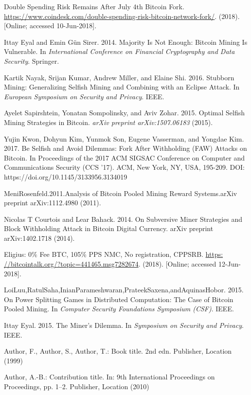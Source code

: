 \documentclass[a4paper, 11pt]{article}
\begin{document}
\begin{CJK*}{UTF8}{gbsn}
\begin{thebibliography}{8}
    Double Spending Risk Remains After July 4th Bitcoin Fork.
    \url{https://www.coindesk.com/double-spending-risk-bitcoin-network-fork/}. 
    (2018). [Online; accessed 10-Jun-2018].

    Ittay Eyal and Emin Gün Sirer. 2014. Majority Is Not Enough: Bitcoin Mining
    Is Vulnerable. 
    In \textit{International Conference on Financial Cryptography and Data
    Security}. Springer.

    Kartik Nayak, Srijan Kumar, Andrew Miller, and Elaine Shi. 2016. Stubborn
    Mining: Generalizing Selfish Mining and Combining with an Eclipse Attack. 
    In \textit{European Symposium on Security and Privacy}. IEEE.

    Ayelet Sapirshtein, Yonatan Sompolinsky, and Aviv Zohar. 2015. Optimal Selfish
    Mining Strategies in Bitcoin.
    \textit{arXiv preprint arXiv:1507.06183} (2015).

    Yujin Kwon, Dohyun Kim, Yunmok Son, Eugene Vasserman, and Yongdae Kim. 2017. 
    Be Selfish and Avoid Dilemmas: Fork After Withholding (FAW) Attacks on Bitcoin. 
    In Proceedings of the 2017 ACM SIGSAC Conference on Computer and Communications Security (CCS '17). 
    ACM, New York, NY, USA, 195-209. DOI: https://doi.org/10.1145/3133956.3134019

    MeniRosenfeld.2011.Analysis of Bitcoin Pooled Mining Reward Systems.arXiv
    preprint arXiv:1112.4980 (2011).

    Nicolas T Courtois and Lear Bahack. 2014. 
    On Subversive Miner Strategies and Block Withholding Attack in Bitcoin Digital Currency. 
    arXiv preprint arXiv:1402.1718 (2014).

    Eligius: 0\% Fee BTC, 105\% PPS NMC, No registration, CPPSRB.
    \url{https: //bitcointalk.org/?topic=441465.msg7282674}.
    (2018).
    [Online; accessed 12-Jun-2018].

    LoiLuu,RatulSaha,InianParameshwaran,PrateekSaxena,andAquinasHobor. 2015. 
    On Power Splitting Games in Distributed Computation: The Case of Bitcoin Pooled Mining. 
    In \textit{Computer Security Foundations Symposium (CSF)}. IEEE.

    Ittay Eyal. 2015. The Miner’s Dilemma. In \textit{Symposium on Security and Privacy}.
IEEE.


    Author, F., Author, S., Author, T.: Book title. 2nd edn. Publisher,
    Location (1999)
    
    Author, A.-B.: Contribution title. In: 9th International Proceedings
    on Proceedings, pp. 1--2. Publisher, Location (2010)

    
    
    \end{thebibliography}
    
    \end{CJK*}
    
    
\end{document}
